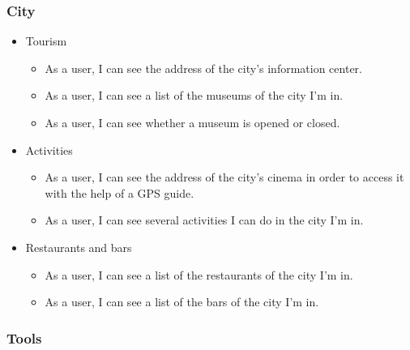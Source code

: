 \documentclass{eplmastersthesis}
\begin{document}
\subsubsection{City}

\begin{itemize}

\item Tourism
\begin{itemize} 
\item As a user, I can see the address of the city's information center.
\item As a user, I can see a list of the museums of the city I'm in.
\item As a user, I can see whether a museum is opened or closed.
\end{itemize}

\item Activities
\begin{itemize} 
\item As a user, I can see the address of the city's cinema in order to access it with the help of a GPS guide.
\item As a user, I can see several activities I can do in the city I'm in.

\end{itemize}

\item Restaurants and bars
\begin{itemize} 
\item As a user, I can see a list of the restaurants of the city I'm in.
\item As a user, I can see a list of the bars of the city I'm in.
\end{itemize}

\end{itemize}

\subsubsection{Tools}
\end{document}
